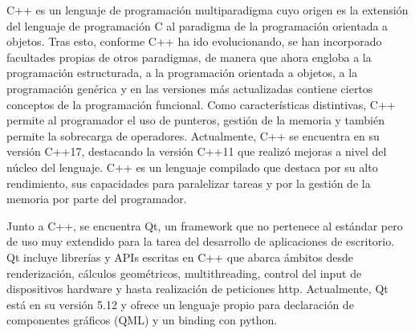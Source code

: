 C++ es un lenguaje de programación multiparadigma cuyo origen es la extensión del lenguaje de programación C al paradigma de la programación orientada a objetos. Tras esto, conforme C++ ha ido evolucionando, se han incorporado facultades propias de otros paradigmas, de manera que ahora engloba a la programación estructurada, a la programación orientada a objetos, a la programación genérica y en las versiones más actualizadas contiene ciertos conceptos de la programación funcional.
Como características distintivas, C++ permite al programador el uso de punteros, gestión de la memoria y también permite la sobrecarga de operadores.
Actualmente, C++ se encuentra en su versión C++17, destacando la versión C++11 que realizó mejoras a nivel del núcleo del lenguaje.
C++ es un lenguaje compilado que destaca por su alto rendimiento, sus capacidades para paralelizar tareas y por la gestión de la memoria por parte del programador.

Junto a C++, se encuentra Qt, un framework que no pertenece al estándar pero de uso muy extendido para la tarea del desarrollo de aplicaciones de escritorio.
Qt incluye librerías y APIs escritas en C++ que abarca ámbitos desde renderización, cálculos geométricos, multithreading, control del input de dispositivos hardware y hasta realización de peticiones http.
Actualmente, Qt está en su versión 5.12 y ofrece un lenguaje propio para declaración de componentes gráficos (QML) y un binding con python.